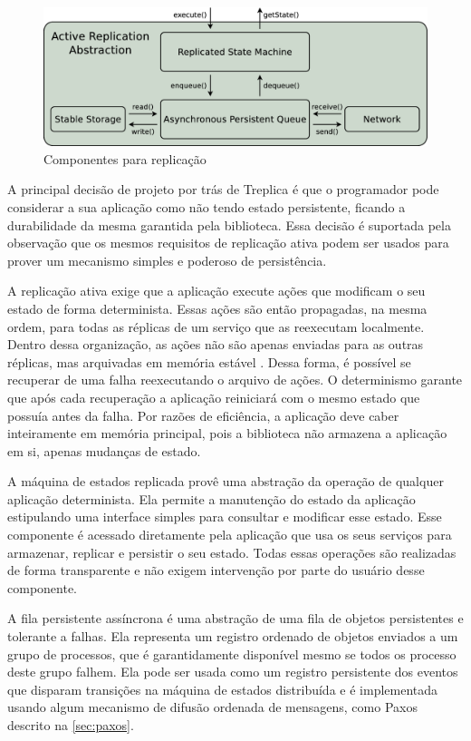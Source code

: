 \begin{figure}[ht]
  \begin{center}
    \includegraphics[width=14cm]{conteudo/capitulos/figuras/treplica.eps}
  \end{center}
  \caption{Componentes para replicação}
  \label{fig:treplica}
\end{figure}

A principal decisão de projeto por trás de Treplica é que o programador pode considerar a
sua aplicação como não tendo estado persistente, ficando a durabilidade da mesma garantida
pela biblioteca. Essa decisão é suportada pela observação que os mesmos requisitos de
replicação ativa podem ser usados para prover um mecanismo simples e poderoso de
persistência.

A replicação ativa exige que a aplicação execute ações que modificam o seu estado de forma
determinista. Essas ações são então propagadas, na mesma ordem, para todas as réplicas de
um serviço que as reexecutam localmente. Dentro dessa organização, as ações não são apenas
enviadas para as outras réplicas, mas arquivadas em memória estável \cite{birrel87}. Dessa
forma, é possível se recuperar de uma falha reexecutando o arquivo de ações. O
determinismo garante que após cada recuperação a aplicação reiniciará com o mesmo estado
que possuía antes da falha. Por razões de eficiência, a aplicação deve caber inteiramente
em memória principal, pois a biblioteca não armazena a aplicação em si, apenas mudanças de
estado.

A máquina de estados replicada provê uma abstração da operação de qualquer aplicação
determinista. Ela permite a manutenção do estado da aplicação estipulando uma interface
simples para consultar e modificar esse estado. Esse componente é acessado diretamente
pela aplicação que usa os seus serviços para armazenar, replicar e persistir o seu estado.
Todas essas operações são realizadas de forma transparente e não exigem intervenção por
parte do usuário desse componente.

A fila persistente assíncrona é uma abstração de uma fila de objetos persistentes e
tolerante a falhas. Ela representa um registro ordenado de objetos enviados a um grupo de
processos, que é garantidamente disponível mesmo se todos os processo deste grupo falhem.
Ela pode ser usada como um registro persistente dos eventos que disparam transições na
máquina de estados distribuída e é implementada usando algum mecanismo de difusão ordenada
de mensagens, como Paxos descrito na \autoref{sec:paxos}.


